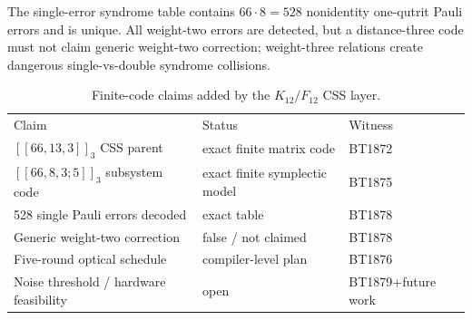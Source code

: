 \begin{remark}
The single-error syndrome table contains $66\cdot 8=528$ nonidentity one-qutrit Pauli
errors and is unique.  All weight-two errors are detected, but a distance-three code
must not claim generic weight-two correction; weight-three relations create dangerous
single-vs-double syndrome collisions.
\end{remark}

\begin{table}[h]
\caption{Finite-code claims added by the $K_{12}/F_{12}$ CSS layer.}
\begin{ruledtabular}
\begin{tabular}{lll}
Claim & Status & Witness \\
\colrule
$[[66,13,3]]_3$ CSS parent & exact finite matrix code & BT1872 \\
$[[66,8,3;5]]_3$ subsystem code & exact finite symplectic model & BT1875 \\
528 single Pauli errors decoded & exact table & BT1878 \\
Generic weight-two correction & false / not claimed & BT1878 \\
Five-round optical schedule & compiler-level plan & BT1876 \\
Noise threshold / hardware feasibility & open & BT1879+future work \\
\end{tabular}
\end{ruledtabular}
\end{table}
